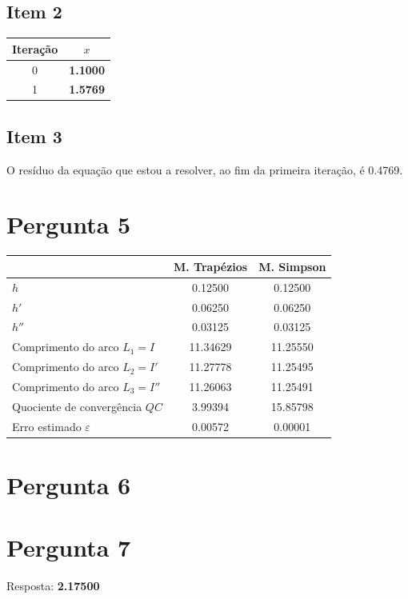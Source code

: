 \subsection{Item 2}

\begin{center}
    \begin{tabular}{c | c}
        Iteração & $x$ \\ \hline
        0 & \textbf{1.1000} \\
        1 & \textbf{1.5769}
    \end{tabular}
\end{center}
\subsection{Item 3}
O resíduo da equação que estou a resolver, ao fim da primeira iteração, é 0.4769.
{
\renewcommand{\thesubsection}{\thesection\alph{subsection}}
\section{Pergunta 5}


\begin{center}
    \begin{tabular}{l | c c}
        & M. Trapézios & M. Simpson \\ \hline
        $h$ & 0.12500  &       0.12500 \\
        $h'$ & 0.06250  &       0.06250 \\
        $h''$ & 0.03125  &       0.03125 \\
        Comprimento do arco $L_1=I$ & 11.34629 &       11.25550 \\
        Comprimento do arco $L_2=I'$ & 11.27778 &       11.25495 \\
        Comprimento do arco $L_3=I''$ & 11.26063 &       11.25491 \\
        Quociente de convergência $QC$ & 3.99394  &       15.85798 \\
        Erro estimado $\varepsilon$ & 0.00572  &       0.00001
    \end{tabular}
\end{center}
\section{Pergunta 6}
\section{Pergunta 7}

Resposta: \textbf{2.17500}
}